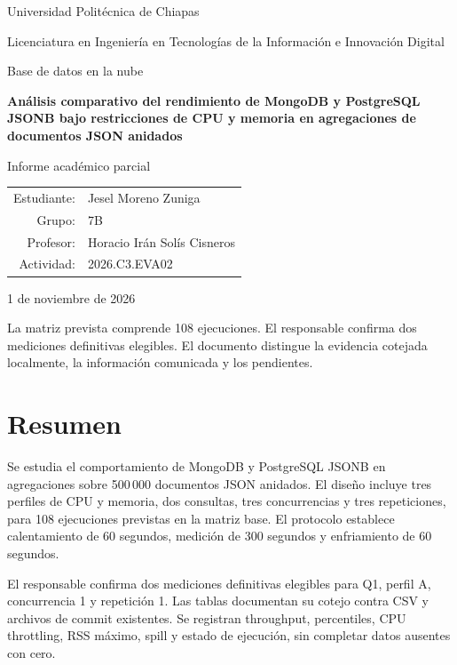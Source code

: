 \documentclass[11pt,letterpaper]{article}
\begin{document}
\begin{titlepage}\centering
{\Large Universidad Politécnica de Chiapas\par}
\vspace{0.6cm}
{\large Licenciatura en Ingeniería en Tecnologías de la Información
e Innovación Digital\par}
\vspace{0.7cm}
{\large Base de datos en la nube\par}
\vspace{0.9cm}
{\LARGE\bfseries Análisis comparativo del rendimiento de MongoDB
y PostgreSQL JSONB bajo restricciones de CPU y memoria
en agregaciones de documentos JSON anidados\par}
\vspace{0.7cm}
{\Large Informe académico parcial\par}
\vspace{0.7cm}
\begin{tabularx}{0.92\linewidth}{rX}
Estudiante: & Jesel Moreno Zuniga\\
Grupo: & 7B\\
Profesor: & Horacio Irán Solís Cisneros\\
Actividad: & 2026.C3.EVA02
\end{tabularx}
\vfill
{1 de noviembre de 2026\par}
\smallskip
\begin{minipage}{0.91\linewidth}\small
La matriz prevista comprende 108 ejecuciones. El responsable confirma
dos mediciones definitivas elegibles. El documento distingue la evidencia
cotejada localmente, la información comunicada y los pendientes.
\end{minipage}
\end{titlepage}

\section*{Resumen}
Se estudia el comportamiento de MongoDB y PostgreSQL JSONB en
agregaciones sobre 500\,000 documentos JSON anidados. El diseño incluye
tres perfiles de CPU y memoria, dos consultas, tres concurrencias y
tres repeticiones, para 108 ejecuciones previstas en la matriz base.
El protocolo establece calentamiento de 60 segundos, medición de
300 segundos y enfriamiento de 60 segundos.

El responsable confirma dos mediciones definitivas elegibles para Q1,
perfil A, concurrencia 1 y repetición 1. Las tablas documentan su cotejo
contra CSV y archivos de commit existentes. Se registran throughput,
percentiles, CPU throttling, RSS máximo, spill y estado de ejecución,
sin completar datos ausentes con cero.
\end{document}
